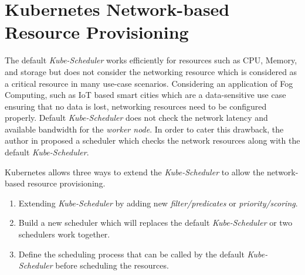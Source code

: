 \section{Kubernetes Network-based Resource Provisioning}
\label{sec:k8s_ns}
The default \emph{Kube-Scheduler} works efficiently for resources such as CPU, Memory, and storage but does not consider the networking resource which is considered as a critical resource in many use-case scenarios\cite{Santos2019}. Considering an application of Fog Computing, such as IoT based smart cities which are a data-sensitive use case ensuring that no data is lost, networking resources need to be configured properly\cite{Santos2019}. Default \emph{Kube-Scheduler} does not check the network latency and available bandwidth for the \emph{worker node}. In order to cater this drawback, the author in \cite{Santos2019} proposed a scheduler which checks the network resources along with the default \emph{Kube-Scheduler}\cite{Santos2019}. \par
Kubernetes allows three ways to extend the \emph{Kube-Scheduler} to allow the network-based resource provisioning\cite{k8s}.
\begin{enumerate}
  \item Extending \emph{Kube-Scheduler} by adding new \emph{filter/predicates} or \emph{priority/scoring}.
  \item Build a new scheduler which will replaces the default \emph{Kube-Scheduler} or two schedulers work together.
  \item Define the scheduling process that can be called by the default \emph{Kube-Scheduler} before scheduling the resources.
\end{enumerate}
